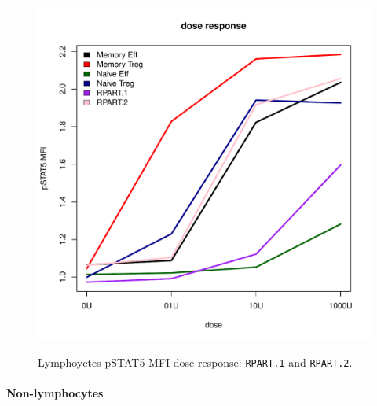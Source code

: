 \begin{figure}
{}
%
\begin{minipage}{.5\textwidth}
  \includegraphics[scale=.4]{figures/rpart-lymphocytes-dose-response}
\end{minipage}
\begin{minipage}{.3\textwidth}
{  Lymphoyctes pSTAT5 MFI dose-response: \texttt{RPART.1} and \texttt{RPART.2}. }
{
}
\end{minipage}
\end{figure}

\clearpage


\paragraph{Non-lymphocytes}

